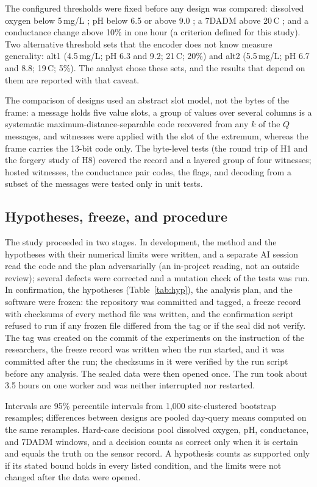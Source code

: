 The configured thresholds were fixed before any design was compared: dissolved oxygen below 5\,mg/L \citep{epa1986do}; pH below 6.5 or above 9.0 \citep{epa1986gold}; a 7DADM above 20\,\textdegree C \citep{epa2003temp}; and a conductance change above 10\% in one hour (a criterion defined for this study). Two alternative threshold sets that the encoder does not know measure generality: alt1 (4.5\,mg/L; pH 6.3 and 9.2; 21\,\textdegree C; 20\%) and alt2 (5.5\,mg/L; pH 6.7 and 8.8; 19\,\textdegree C; 5\%). The analyst chose these sets, and the results that depend on them are reported with that caveat.

The comparison of designs used an abstract slot model, not the bytes of the frame: a message holds five value slots, a group of values over several columns is a systematic maximum-distance-separable code recovered from any $k$ of the $Q$ messages, and witnesses were applied with the slot of the extremum, whereas the frame carries the 13-bit code only. The byte-level tests (the round trip of H1 and the forgery study of H8) covered the record and a layered group of four witnesses; hosted witnesses, the conductance pair codes, the flags, and decoding from a subset of the messages were tested only in unit tests.

\subsection{Hypotheses, freeze, and procedure}
\label{sec:procedure}
The study proceeded in two stages. In development, the method and the hypotheses with their numerical limits were written, and a separate AI session read the code and the plan adversarially (an in-project reading, not an outside review); several defects were corrected and a mutation check of the tests was run. In confirmation, the hypotheses (Table~\ref{tab:hyp}), the analysis plan, and the software were frozen: the repository was committed and tagged, a freeze record with checksums of every method file was written, and the confirmation script refused to run if any frozen file differed from the tag or if the seal did not verify. The tag was created on the commit of the experiments on the instruction of the researchers, the freeze record was written when the run started, and it was committed after the run; the checksums in it were verified by the run script before any analysis. The sealed data were then opened once. The run took about 3.5 hours on one worker and was neither interrupted nor restarted.

Intervals are 95\% percentile intervals from 1,000 site-clustered bootstrap resamples; differences between designs are pooled day-query means computed on the same resamples. Hard-case decisions pool dissolved oxygen, pH, conductance, and 7DADM windows, and a decision counts as correct only when it is certain and equals the truth on the sensor record. A hypothesis counts as supported only if its stated bound holds in every listed condition, and the limits were not changed after the data were opened.

